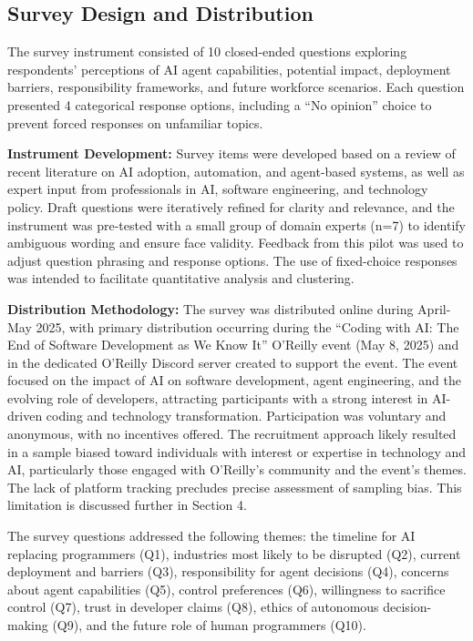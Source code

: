 \documentclass{article}
\begin{document}
\subsection{Survey Design and Distribution}\label{survey-design-and-distribution}

The survey instrument consisted of 10 closed-ended questions exploring
respondents' perceptions of AI agent capabilities, potential impact,
deployment barriers, responsibility frameworks, and future workforce
scenarios. Each question presented 4 categorical response options,
including a ``No opinion'' choice to prevent forced responses on
unfamiliar topics.

\textbf{Instrument Development:} Survey items were developed based on a
review of recent literature on AI adoption, automation, and agent-based
systems, as well as expert input from professionals in AI, software
engineering, and technology policy. Draft questions were iteratively
refined for clarity and relevance, and the instrument was pre-tested
with a small group of domain experts (n=7) to identify ambiguous wording
and ensure face validity. Feedback from this pilot was used to adjust
question phrasing and response options. The use of fixed-choice
responses was intended to facilitate quantitative analysis and
clustering.

\textbf{Distribution Methodology:} The survey was distributed online
during April-May 2025, with primary distribution occurring during the
``Coding with AI: The End of Software Development as We Know It''
O'Reilly event (May 8, 2025) and in the dedicated O'Reilly Discord
server created to support the event. The event focused on the impact of
AI on software development, agent engineering, and the evolving role of
developers, attracting participants with a strong interest in AI-driven
coding and technology transformation. Participation was voluntary and anonymous, with no
incentives offered. The recruitment approach likely resulted in a sample
biased toward individuals with interest or expertise in technology and
AI, particularly those engaged with O'Reilly's community and the event's
themes. The lack of platform tracking precludes precise assessment of
sampling bias. This limitation is discussed further in Section 4.

The survey questions addressed the following themes: the timeline for AI replacing programmers (Q1), industries most likely to be disrupted (Q2), current deployment and barriers (Q3), responsibility for agent decisions (Q4), concerns about agent capabilities (Q5), control preferences (Q6), willingness to sacrifice control (Q7), trust in developer claims (Q8), ethics of autonomous decision-making (Q9), and the future role of human programmers (Q10).
\end{document}
